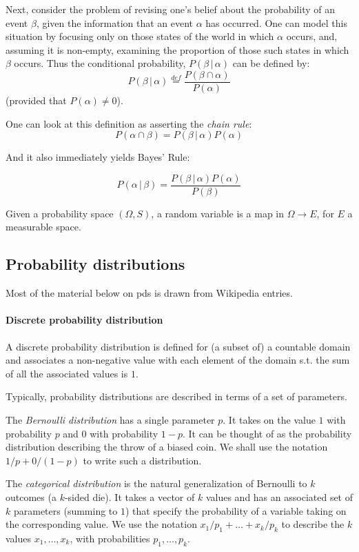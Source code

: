 \documentclass{article}
\newcommand{\alt}{\,|\,}
\newcommand{\defeq}{\stackrel{{\scriptscriptstyle def}}{=}}
\begin{document}
Next, consider the problem of revising one's belief about the probability of an event $\beta$, given the information that an event $\alpha$ has occurred. One can model this situation by focusing only on those states of the world in which $\alpha$ occurs, and, assuming it is non-empty, examining the proportion of those such states in which $\beta$ occurs. Thus the conditional probability, $P(\beta\alt \alpha)$ can be defined by:
$$ P(\beta \alt \alpha) \defeq \frac{P(\beta \cap \alpha)}{P(\alpha)}$$
\noindent (provided that $P(\alpha)\not= 0$). 

One can look at this definition as asserting the {\em chain rule}:
$$P(\alpha \cap \beta)=P(\beta \alt \alpha) P(\alpha)$$

And it also immediately yields Bayes' Rule:

$$ P(\alpha \alt \beta) = \frac{P(\beta \alt \alpha) P(\alpha)}{P(\beta)}$$


\begin{definition}
  Given a probability space $(\Omega, S)$, a random variable is a map in $\Omega \rightarrow E$, for $E$ a measurable space.
\end{definition}

\subsection{Probability distributions}
Most of the material below  on pds is drawn from Wikipedia entries.

\paragraph{Discrete probability distribution}
A discrete probability distribution is defined for (a subset of) a countable domain and associates a non-negative value with each element of the domain s.t. the sum of all the associated values is $1$. 

Typically, probability distributions are described in terms of a set of parameters.

The {\em Bernoulli distribution} has a single parameter $p$. It takes on the value $1$ with probability $p$ and $0$ with probability $1-p$. It can be thought of as the probability distribution describing the throw of a biased coin. We shall use the notation $1/p+0/(1-p)$ to write such a distribution.

The {\em categorical distribution} is the natural generalization of Bernoulli to $k$ outcomes (a $k$-sided die). It takes a vector of $k$ values and has an associated set of $k$ parameters (summing to $1$) that specify the probability of a variable taking on the corresponding value. We use the notation $x_1/p_1  + \ldots + x_k/p_k$ to describe the $k$ values $x_1, \ldots, x_k$, with probabilities $p_1, \ldots, p_k$.
\end{document}
